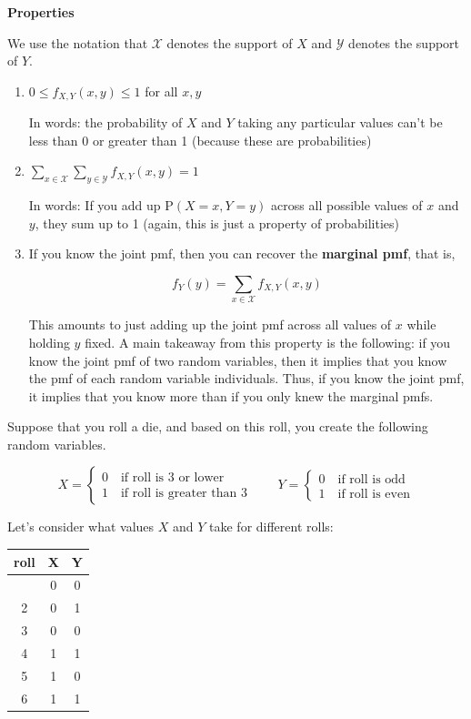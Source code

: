 \documentclass[
  letterpaper,
  DIV=11,
  numbers=noendperiod]{scrreprt}
\begin{document}
\textbf{Properties}

We use the notation that \(\mathcal{X}\) denotes the support of \(X\)
and \(\mathcal{Y}\) denotes the support of \(Y\).

\begin{enumerate}
\def\labelenumi{\arabic{enumi}.}
\item
  \(0 \leq f_{X,Y}(x,y) \leq 1\) for all \(x,y\)

  In words: the probability of \(X\) and \(Y\) taking any particular
  values can't be less than 0 or greater than 1 (because these are
  probabilities)
\item
  \(\displaystyle \sum_{x \in \mathcal{X}} \sum_{y \in \mathcal{Y}} f_{X,Y}(x,y) = 1\)

  In words: If you add up \(\mathrm{P}(X=x, Y=y)\) across all possible
  values of \(x\) and \(y\), they sum up to 1 (again, this is just a
  property of probabilities)
\item
  If you know the joint pmf, then you can recover the \textbf{marginal
  pmf}, that is,

  \[
   f_Y(y) = \sum_{x \in \mathcal{X}} f_{X,Y}(x,y)
   \]

  This amounts to just adding up the joint pmf across all values of
  \(x\) while holding \(y\) fixed. A main takeaway from this property is
  the following: if you know the joint pmf of two random variables, then
  it implies that you know the pmf of each random variable individuals.
  Thus, if you know the joint pmf, it implies that you know more than if
  you only knew the marginal pmfs.
\end{enumerate}

Suppose that you roll a die, and based on this roll, you create the
following random variables.

\[
  X = \begin{cases} 0 \quad \textrm{if roll is 3 or lower} \\
  1 \quad \textrm{if roll is greater than 3} \end{cases} \qquad Y = \begin{cases} 0 \quad \textrm{if roll is odd} \\
  1 \quad \textrm{if roll is even} \end{cases}
\]

Let's consider what values \(X\) and \(Y\) take for different rolls:

\begin{longtable}[]{@{}ccc@{}}
\toprule\noalign{}
\textbf{roll} & \textbf{X} & \textbf{Y} \\
\midrule\noalign{}
\endhead
\bottomrule\noalign{}
\endlastfoot
1 & 0 & 0 \\
2 & 0 & 1 \\
3 & 0 & 0 \\
4 & 1 & 1 \\
5 & 1 & 0 \\
6 & 1 & 1 \\
\end{longtable}
\end{document}
